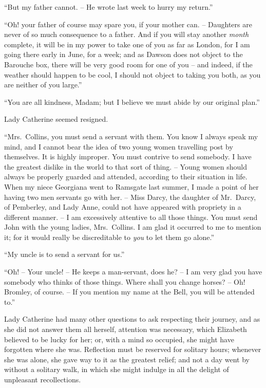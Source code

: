 “But my father cannot. -- He wrote last week to hurry
my return.”

“Oh! your father of course may spare you, if your
mother can. -- Daughters are never of so much consequence
to a father. And if you will stay another \textit{month} complete,
it will be in my power to take one of you as far as London,
for I am going there early in June, for a week; and as
Dawson does not object to the Barouche box, there
will be very good room for one of you -- and indeed,
if the weather should happen to be cool, I should not
object to taking you both, as you are neither of you
large.”

“You are all kindness, Madam; but I believe we must
abide by our original plan.”

Lady Catherine seemed resigned.

“Mrs.\ Collins, you must send a servant with them.
You know I always speak my mind, and I cannot bear the
idea of two young women travelling post by themselves.
It is highly improper. You must contrive to send somebody.
I have the greatest dislike in the world to that
sort of thing. -- Young women should always be properly
guarded and attended, according to their situation in
life. When my niece Georgiana went to Ramsgate last
summer, I made a point of her having two men servants
go with her. -- Miss Darcy, the daughter of Mr.\ Darcy,
of Pemberley, and Lady Anne, could not have appeared
with propriety in a different manner. -- I am excessively
attentive to all those things. You must send John with
the young ladies, Mrs.\ Collins. I am glad it occurred to
me to mention it; for it would really be discreditable to
\textit{you} to let them go alone.”

“My uncle is to send a servant for us.”

“Oh! -- Your uncle! -- He keeps a man-servant, does
he? -- I am very glad you have somebody who thinks of
those things. Where shall you change horses? -- Oh!
Bromley, of course. -- If you mention my name at the
Bell, you will be attended to.”

Lady Catherine had many other questions to ask
respecting their journey, and as she did not answer them
all herself, attention was necessary, which Elizabeth
believed to be lucky for her; or, with a mind so occupied,
she might have forgotten where she was. Reflection
must be reserved for solitary hours; whenever she was
alone, she gave way to it as the greatest relief; and
not a day went by without a solitary walk, in which
she might indulge in all the delight of unpleasant
recollections.

